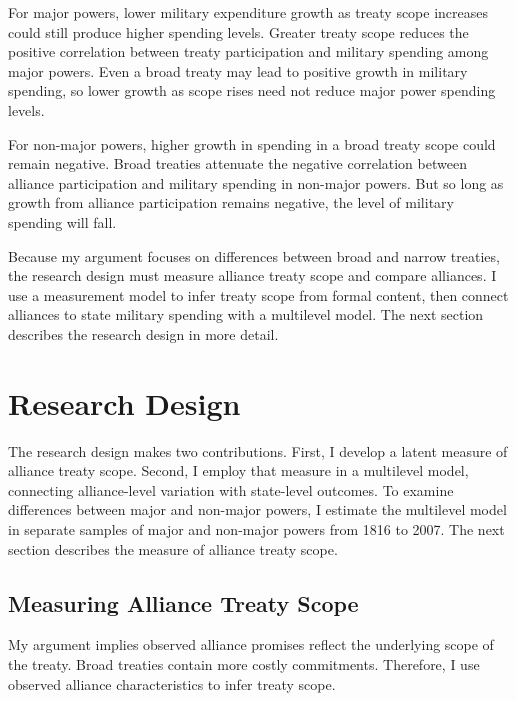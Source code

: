 \documentclass[12pt]{article}
\begin{document}
For major powers, lower military expenditure growth as treaty scope increases could still produce higher spending levels. 
Greater treaty scope reduces the positive correlation between treaty participation and military spending among major powers. 
Even a broad treaty may lead to positive growth in military spending, so lower growth as scope rises need not reduce major power spending levels. 


For non-major powers, higher growth in spending in a broad treaty scope could remain negative. 
Broad treaties attenuate the negative correlation between alliance participation and military spending in non-major powers. 
But so long as growth from alliance participation remains negative, the level of military spending will fall. 


Because my argument focuses on differences between broad and narrow treaties, the research design must measure alliance treaty scope and compare alliances.  
I use a measurement model to infer treaty scope from formal content, then connect alliances to state military spending with a multilevel model. 
The next section describes the research design in more detail. 



\section{Research Design} 


The research design makes two contributions. 
First, I develop a latent measure of alliance treaty scope. 
Second, I employ that measure in a multilevel model, connecting alliance-level variation with state-level outcomes. 
To examine differences between major and non-major powers, I estimate the multilevel model in separate samples of major and non-major powers from 1816 to 2007. 
The next section describes the measure of alliance treaty scope. 


\subsection{Measuring Alliance Treaty Scope} 


My argument implies observed alliance promises reflect the underlying scope of the treaty. 
Broad treaties contain more costly commitments. 
Therefore, I use observed alliance characteristics to infer treaty scope.
\end{document}
